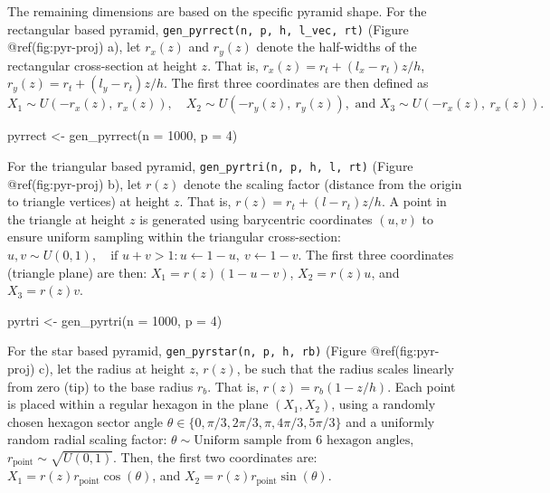 \documentclass[
  11pt,
  a4paper,
]{report}
\newenvironment{Shaded}{\begin{snugshade}}{\end{snugshade}}
\newcommand{\AttributeTok}[1]{\textcolor[rgb]{0.40,0.45,0.13}{#1}}
\newcommand{\DecValTok}[1]{\textcolor[rgb]{0.68,0.00,0.00}{#1}}
\newcommand{\FunctionTok}[1]{\textcolor[rgb]{0.28,0.35,0.67}{#1}}
\newcommand{\NormalTok}[1]{\textcolor[rgb]{0.00,0.23,0.31}{#1}}
\newcommand{\OtherTok}[1]{\textcolor[rgb]{0.00,0.23,0.31}{#1}}
\begin{document}
The remaining dimensions are based on the specific pyramid shape. For
the rectangular based pyramid,
\texttt{gen\_pyrrect(n,\ p,\ h,\ l\_vec,\ rt)} (Figure
@ref(fig:pyr-proj) a), let \(r_x(z)\) and \(r_y(z)\) denote the
half-widths of the rectangular cross-section at height \(z\). That is,
\(r_x(z) = r_t + (l_x - r_t)z/h\), \(r_y(z) = r_t + (l_y - r_t)z/h\).
The first three coordinates are then defined as
\(X_1 \sim U(-r_x(z),\ r_x(z)), \quad X_2 \sim U(-r_y(z),\ r_y(z)),\text{ and }X_3 \sim U(-r_x(z),\ r_x(z)).\)

\begin{Shaded}
\begin{Highlighting}[]
\NormalTok{pyrrect }\OtherTok{\textless{}{-}} \FunctionTok{gen\_pyrrect}\NormalTok{(}\AttributeTok{n =} \DecValTok{1000}\NormalTok{, }\AttributeTok{p =} \DecValTok{4}\NormalTok{)}
\end{Highlighting}
\end{Shaded}

For the triangular based pyramid,
\texttt{gen\_pyrtri(n,\ p,\ h,\ l,\ rt)} (Figure @ref(fig:pyr-proj) b),
let \(r(z)\) denote the scaling factor (distance from the origin to
triangle vertices) at height \(z\). That is,
\(r(z) = r_t + (l-r_t)z/h\). A point in the triangle at height \(z\) is
generated using barycentric coordinates \((u, v)\) to ensure uniform
sampling within the triangular cross-section:
\(u, v \sim U(0, 1), \quad \text{if } u + v > 1: u \leftarrow 1 - u,\ v \leftarrow 1 - v\).
The first three coordinates (triangle plane) are then:
\(X_1 = r(z)(1 - u - v)\), \(X_2 = r(z)u\), and \(X_3 = r(z)v.\)

\begin{Shaded}
\begin{Highlighting}[]
\NormalTok{pyrtri }\OtherTok{\textless{}{-}} \FunctionTok{gen\_pyrtri}\NormalTok{(}\AttributeTok{n =} \DecValTok{1000}\NormalTok{, }\AttributeTok{p =} \DecValTok{4}\NormalTok{)}
\end{Highlighting}
\end{Shaded}

For the star based pyramid, \texttt{gen\_pyrstar(n,\ p,\ h,\ rb)}
(Figure @ref(fig:pyr-proj) c), let the radius at height \(z\), \(r(z)\),
be such that the radius scales linearly from zero (tip) to the base
radius \(r_b\). That is, \(r(z) = r_b\left(1 - z/h\right)\). Each point
is placed within a regular hexagon in the plane \((X_1, X_2)\), using a
randomly chosen hexagon sector angle
\(\theta \in \{0, \pi/3, 2\pi/3, \pi, 4\pi/3, 5\pi/3\}\) and a uniformly
random radial scaling factor:
\(\theta \sim \text{Uniform sample from 6 hexagon angles}\),
\(r_{\text{point}} \sim \sqrt{U(0, 1)}\). Then, the first two
coordinates are: \(X_1 = r(z)r_{\text{point}}\cos(\theta)\), and
\(X_2 = r(z)r_{\text{point}}\sin(\theta)\).
\end{document}
